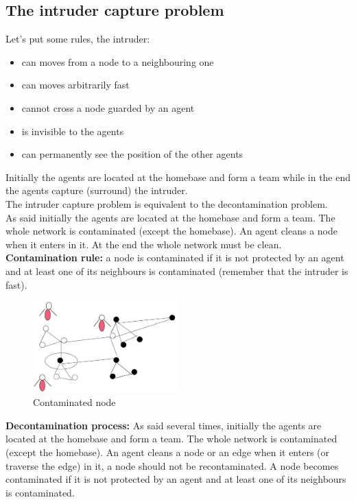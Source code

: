\documentclass[paper=a4, fontsize=11pt]{scrartcl} %
\numberwithin{equation}{section} %
\numberwithin{figure}{section} %
\numberwithin{table}{section} %
\begin{document}
\subsection*{The intruder capture problem}
Let's put some rules, the intruder:
\begin{itemize}
\item can moves from a node to a neighbouring one
\item can moves arbitrarily fast
\item cannot cross a node guarded by an agent
\item is invisible to the agents
\item can permanently see the position of the other agents
\end{itemize}
Initially the agents are located at the homebase and form a team while in the end the agents capture (surround) the intruder. \\
The intruder capture problem is equivalent to the decontamination problem.\\
As said initially the agents are located at the homebase and form a team. The whole network is contaminated (except the homebase). An agent cleans a node when it enters in it. At the end the whole network must be clean.\\
\textbf{Contamination rule:} a node is contaminated if it is not protected by an agent and at least one of its neighbours is contaminated (remember that the intruder is fast). 
\begin{figure}[H]
  \centering
  \includegraphics[width=0.5\textwidth]{img/cont.png}
  \caption{Contaminated node}
  \label{fig:boat1}
\end{figure}
\textbf{Decontamination process:} As said several times, initially the agents are located at the homebase and form a team. The whole network is contaminated (except the homebase). An agent cleans a node or an edge when it enters (or traverse the edge) in it, a node should not be recontaminated. A node becomes contaminated if it is not protected by an agent and at least one of its neighbours is contaminated.\\
\end{document}
